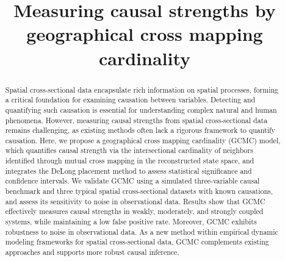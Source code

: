 \documentclass[authoryear,preprint,review,12pt]{elsarticle}
\begin{document}
\begin{frontmatter}
\title{Measuring causal strengths by geographical cross mapping cardinality}










\begin{abstract}

Spatial cross-sectional data encapsulate rich information on spatial processes, forming a critical foundation for examining causation between variables. Detecting and quantifying such causation is essential for understanding complex natural and human phenomena. However, measuring causal strengths from spatial cross-sectional data remains challenging, as existing methods often lack a rigorous framework to quantify causation. Here, we propose a geographical cross mapping cardinality (GCMC) model, which quantifies causal strength via the intersectional cardinality of neighbors identified through mutual cross mapping in the reconstructed state space, and integrates the DeLong placement method to assess statistical significance and confidence intervals. We validate GCMC using a simulated three-variable causal benchmark and three typical spatial cross-sectional datasets with known causations, and assess its sensitivity to noise in observational data. Results show that GCMC effectively measures causal strengths in weakly, moderately, and strongly coupled systems, while maintaining a low false positive rate. Moreover, GCMC exhibits robustness to noise in observational data. As a new method within empirical dynamic modeling frameworks for spatial cross-sectional data, GCMC complements existing approaches and supports more robust causal inference.


\end{abstract}
\end{frontmatter}
\end{document}
